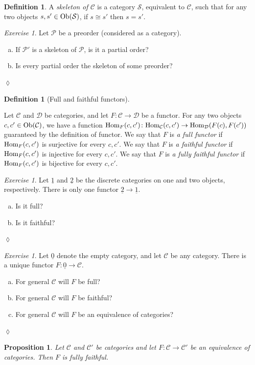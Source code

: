 \documentclass{book}
\def\tn{\textnormal}
\def\mc{\mathcal}
\def\Hom{\tn{Hom}}
\def\Ob{\tn{Ob}}
\def\to{\rightarrow}
\def\taking{\colon}
\def\iso{\cong}
\def\ul{\underline}
\def\mcC{\mc{C}}
\def\mcD{\mc{D}}
\def\mcP{\mc{P}}
\def\mcS{\mc{S}}
\newtheorem{proposition}[subsubsection]{Proposition}
\theoremstyle{remark}
\newtheorem{exc}[subsubsection]{Exercise}
\newenvironment{exercise}{\begin{exc}}{\hspace*{\fill}$\lozenge$\end{exc}}
\theoremstyle{definition}
\newtheorem{definition}[subsubsection]{Definition}
\def\sexc{\begin{enumerate}[a.)]\setlength{\itemsep}{.1cm}\setlength{\parskip}{.1cm}\item}
\def\next{\item}
\def\endsexc{\end{enumerate}}
\begin{document}
\begin{definition}

A {\em skeleton of $\mcC$} is a category $\mcS$, equivalent to $\mcC$, such that for any two objects $s,s'\in\Ob(\mcS)$, if $s\iso s'$ then $s=s'$. 

\end{definition}

\begin{exercise}
Let $\mcP$ be a preorder (considered as a category).
\sexc If $\mcP'$ is a skeleton of $\mcP$, is it a partial order?
\next Is every partial order the skeleton of some preorder?
\endsexc
\end{exercise}

\begin{definition}[Full and faithful functors]\label{def:full faithful}

Let $\mcC$ and $\mcD$ be categories, and let $F\taking\mcC\to\mcD$ be a functor. For any two objects $c,c'\in\Ob(\mcC)$, we have a function $\Hom_F(c,c')\taking\Hom_\mcC(c,c')\to\Hom_\mcD(F(c),F(c'))$ guaranteed by the definition of functor.
We say that $F$ is {\em a full functor} if $\Hom_F(c,c')$ is surjective for every $c,c'$.
We say that $F$ is {\em a faithful functor} if $\Hom_F(c,c')$ is injective for every $c,c'$. We say that $F$ is {\em a fully faithful functor} if $\Hom_F(c,c')$ is bijective for every $c,c'$.

\end{definition}

\begin{exercise}
Let $\ul{1}$ and $\ul{2}$ be the discrete categories on one and two objects, respectively. There is only one functor $\ul{2}\to\ul{1}$.
\sexc Is it full?
\next Is it faithful?
\endsexc
\end{exercise}

\begin{exercise}\label{exc:empty fully faithful}
Let $\ul{0}$ denote the empty category, and let $\mcC$ be any category. There is a unique functor $F\taking \ul{0}\to\mcC$.
\sexc For general $\mcC$ will $F$ be full?
\next For general $\mcC$ will $F$ be faithful?
\next For general $\mcC$ will $F$ be an equivalence of categories?
\endsexc
\end{exercise}

\begin{proposition}

Let $\mcC$ and $\mcC'$ be categories and let $F\taking\mcC\to\mcC'$ be an equivalence of categories. Then $F$ is fully faithful.

\end{proposition}
\end{document}
